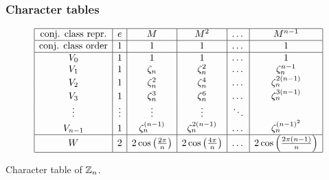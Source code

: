         \subsubsection{Character tables}

            \begin{table}[H]
                \centering
                {\small
                \begin{equation*}
                        \begin{array}{|c|c|c|c|c|c|}
                            \hline
                            \text{conj. class repr.} & e & M & M^2 & \dots & M^{n-1} \\ \hline
                            \text{conj. class order} & 1 & 1 & 1 & \dots & 1 \\
                            \hline
                            V_0 & 1 & 1 & 1 & \dots & 1 \\
                            V_1 & 1 & \zeta_n & \zeta^2_n & \dots & \zeta^{n-1}_n \\
                            V_2 & 1 & \zeta^2_n & \zeta^4_n & \dots & \zeta^{2(n-1)}_n \\
                            V_3 & 1 & \zeta^3_n & \zeta^6_n & \dots & \zeta^{3(n-1)}_n \\
                            \vdots & \vdots & \vdots & \vdots & \ddots &  \\
                            V_{n-1} & 1 & \zeta^{(n-1)}_n & \zeta^{2(n-1)}_n & \dots & \zeta^{(n-1)^2}_n \\ \hline
                            W & 2 & 2\cos\left(\frac{2\pi}{n}\right) & 2\cos\left(\frac{4\pi}{n}\right) & \dots & 2\cos\left(\frac{2\pi(n-1)}{n}\right) \\ \hline 
                            \end{array}
                    \end{equation*}}
                \caption{Character table of $\mathbb{Z}_n$.}
            \end{table}

